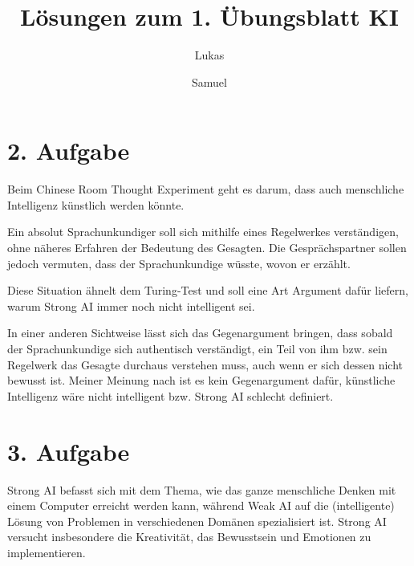 \documentclass{article}
\begin{document}
\title{L\"osungen zum 1. \"Ubungsblatt KI}
\author{Lukas \and Samuel}
\section*{2. Aufgabe}

Beim Chinese Room Thought Experiment geht es darum, dass auch menschliche Intelligenz k\"unstlich werden k\"onnte.

Ein absolut Sprachunkundiger soll sich mithilfe eines Regelwerkes verst\"andigen, ohne n\"aheres Erfahren der Bedeutung des Gesagten. Die Gespr\"achspartner sollen jedoch vermuten, dass der Sprachunkundige w\"usste, wovon er erz\"ahlt.

Diese Situation \"ahnelt dem Turing-Test und soll eine Art Argument daf\"ur liefern, warum Strong AI immer noch nicht intelligent sei.

In einer anderen Sichtweise l\"asst sich das Gegenargument bringen, dass sobald der Sprachunkundige sich authentisch verst\"andigt, ein Teil von ihm bzw. sein Regelwerk das Gesagte durchaus verstehen muss, auch wenn er sich dessen nicht bewusst ist. Meiner Meinung nach ist es kein Gegenargument daf\"ur, k\"unstliche Intelligenz w\"are nicht intelligent bzw. Strong AI schlecht definiert.

\section*{3. Aufgabe}

Strong AI befasst sich mit dem Thema, wie das ganze menschliche Denken mit einem Computer erreicht werden kann, w\"ahrend Weak AI auf die (intelligente) L\"osung von Problemen in verschiedenen Dom\"anen spezialisiert ist. Strong AI versucht insbesondere die Kreativit\"at, das Bewusstsein und Emotionen zu implementieren.
\end{document}
